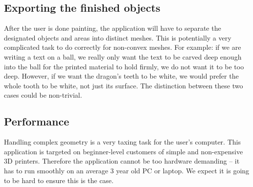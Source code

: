 \subsection{Exporting the finished objects}

After the user is done painting, the application will have to separate the designated objects and areas into distinct meshes. This is potentially a very complicated task to do correctly for non-convex meshes. For example: if we are writing a text on a ball, we really only want the text to be carved deep enough into the ball for the printed material to hold firmly, we do not want it to be too deep. However, if we want the dragon's teeth to be white, we would prefer the whole tooth to be white, not just its surface. The distinction between these two cases could be non-trivial.

\subsection{Performance}

Handling complex geometry is a very taxing task for the user's computer. This application is targeted on beginner-level customers of simple and non-expensive 3D printers. Therefore the application cannot be too hardware demanding -- it has to run smoothly on an average 3 year old PC or laptop. We expect it is going to be hard to ensure this is the case.



